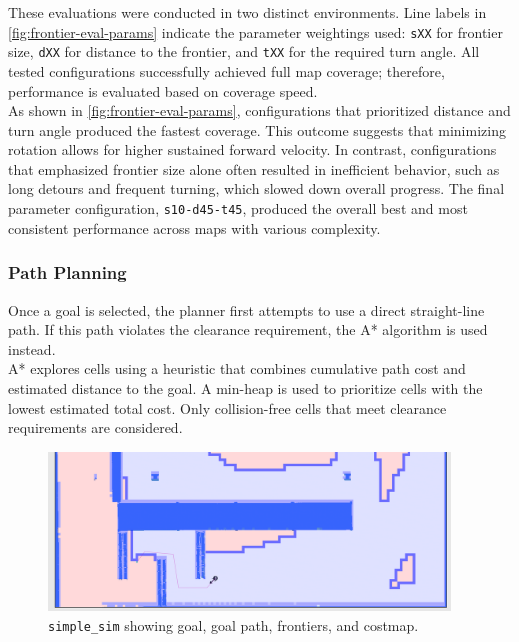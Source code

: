 These evaluations were conducted in two distinct environments. Line labels in \cref{fig:frontier-eval-params} indicate the parameter weightings used: \texttt{sXX} for frontier size, \texttt{dXX} for distance to the frontier, and \texttt{tXX} for the required turn angle. All tested configurations successfully achieved full map coverage; therefore, performance is evaluated based on coverage speed. \\

As shown in \cref{fig:frontier-eval-params}, configurations that prioritized distance and turn angle produced the fastest coverage. This outcome suggests that minimizing rotation allows for higher sustained forward velocity. In contrast, configurations that emphasized frontier size alone often resulted in inefficient behavior, such as long detours and frequent turning, which slowed down overall progress. The final parameter configuration, \texttt{s10-d45-t45}, produced the overall best  and most consistent performance across maps with various complexity.

\subsubsection{Path Planning}
\label{sec:path_planning}
Once a goal is selected, the planner first attempts to use a direct straight-line path. If this path violates the clearance requirement, the A* algorithm is used instead. \\

A* explores cells using a heuristic that combines cumulative path cost and estimated distance to the goal. A min-heap is used to prioritize cells with the lowest estimated total cost. Only collision-free cells that meet clearance requirements are considered.

\begin{figure}[H]
  \begin{center}
    \includegraphics[width=0.95\textwidth]{./figures/screenshots/path-planning.png}
  \end{center}
  \caption{\texttt{simple\_sim} showing goal, goal path, frontiers, and costmap.}
  \label{fig:path_planning}
\end{figure}



